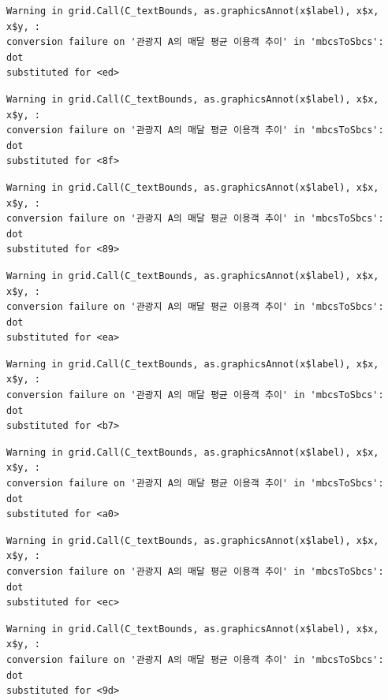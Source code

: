 \documentclass[
  letterpaper,
  DIV=11,
  numbers=noendperiod]{scrreprt}
\begin{document}
\begin{verbatim}
Warning in grid.Call(C_textBounds, as.graphicsAnnot(x$label), x$x, x$y, :
conversion failure on '관광지 A의 매달 평균 이용객 추이' in 'mbcsToSbcs': dot
substituted for <ed>
\end{verbatim}

\begin{verbatim}
Warning in grid.Call(C_textBounds, as.graphicsAnnot(x$label), x$x, x$y, :
conversion failure on '관광지 A의 매달 평균 이용객 추이' in 'mbcsToSbcs': dot
substituted for <8f>
\end{verbatim}

\begin{verbatim}
Warning in grid.Call(C_textBounds, as.graphicsAnnot(x$label), x$x, x$y, :
conversion failure on '관광지 A의 매달 평균 이용객 추이' in 'mbcsToSbcs': dot
substituted for <89>
\end{verbatim}

\begin{verbatim}
Warning in grid.Call(C_textBounds, as.graphicsAnnot(x$label), x$x, x$y, :
conversion failure on '관광지 A의 매달 평균 이용객 추이' in 'mbcsToSbcs': dot
substituted for <ea>
\end{verbatim}

\begin{verbatim}
Warning in grid.Call(C_textBounds, as.graphicsAnnot(x$label), x$x, x$y, :
conversion failure on '관광지 A의 매달 평균 이용객 추이' in 'mbcsToSbcs': dot
substituted for <b7>
\end{verbatim}

\begin{verbatim}
Warning in grid.Call(C_textBounds, as.graphicsAnnot(x$label), x$x, x$y, :
conversion failure on '관광지 A의 매달 평균 이용객 추이' in 'mbcsToSbcs': dot
substituted for <a0>
\end{verbatim}

\begin{verbatim}
Warning in grid.Call(C_textBounds, as.graphicsAnnot(x$label), x$x, x$y, :
conversion failure on '관광지 A의 매달 평균 이용객 추이' in 'mbcsToSbcs': dot
substituted for <ec>
\end{verbatim}

\begin{verbatim}
Warning in grid.Call(C_textBounds, as.graphicsAnnot(x$label), x$x, x$y, :
conversion failure on '관광지 A의 매달 평균 이용객 추이' in 'mbcsToSbcs': dot
substituted for <9d>
\end{verbatim}
\end{document}
